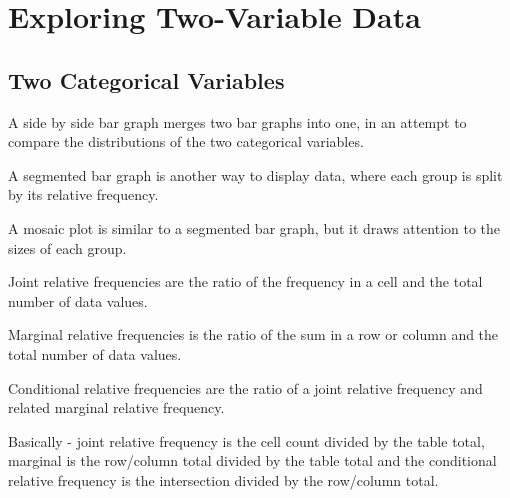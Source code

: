 \documentclass[../stats.tex]{subfiles}
\begin{document}
\chapter{Exploring Two-Variable Data}
\section{Two Categorical Variables}
A side by side bar graph merges two bar graphs into one, in an attempt to compare the distributions of the two categorical variables.

A segmented bar graph is another way to display data, where each group is split by its relative frequency. 

A mosaic plot is similar to a segmented bar graph, but it draws attention to the sizes of each group.

Joint relative frequencies are the ratio of the frequency in a cell and the total number of data values.

Marginal relative frequencies is the ratio of the sum in a row or column and the total number of data values.

Conditional relative frequencies are the ratio of a joint relative frequency and related marginal relative frequency.

Basically - joint relative frequency is the cell count divided by the table total, marginal is the row/column total divided by the table total and the conditional relative frequency is the intersection divided by the row/column total.
\end{document}
